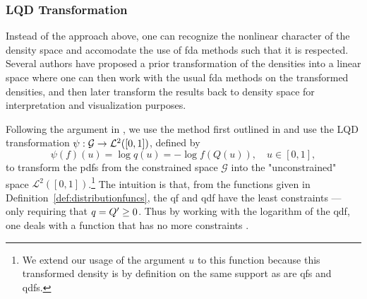 \subsubsection{LQD Transformation}
\label{sec:transformation_interpretation}
Instead of the approach above, one can recognize the nonlinear character of the density
space and accomodate the use of fda methods such that it is respected. Several authors
have proposed a prior transformation of the densities into a linear space
\parencites[e.g.][]{Hron2016}[][]{PetersenMüller2016} where one can then work with the
usual fda methods on the transformed densities, and then later transform the results
back to density space for interpretation and visualization purposes.

Following the argument in \textcite{KokoszkaEtAl2019}, we use the method first outlined
in \textcite{PetersenMüller2016} and use the LQD transformation
$\psi : \nobreak \mathcal{G} \to \mathcal{L}^2([0,1])$, defined by
\begin{equation}
    \label{eq:lqd_definition}
    \psi (f)(u) = \log q(u) = -\log f(Q(u)), \quad u \in [0,1],
\end{equation}
to transform the pdfs from the constrained space $\mathcal{G}$ into the "unconstrained"
space $\mathcal{L}^2([0,1])$.\footnote{We extend our usage of the argument $u$ to this
function because this transformed density is by definition on the same support as are
qfs and qdfs.} The intuition is that, from the functions given in
Definition~\ref{def:distributionfuncs}, the qf and qdf have the least constraints ---
only requiring that $q = \nobreak Q' \geq \nobreak 0$. Thus by working with the logarithm
of the qdf, one deals with a function that has no more constraints \parencite[cf.][]{KokoszkaEtAl2019}.

